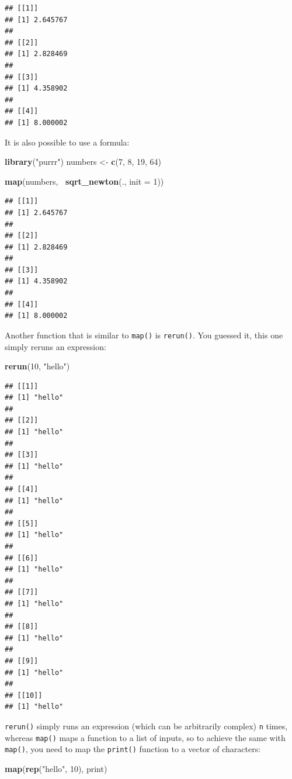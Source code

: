\documentclass[]{gitbook}
\newenvironment{Shaded}{\begin{snugshade}}{\end{snugshade}}
\newcommand{\DataTypeTok}[1]{\textcolor[rgb]{0.13,0.29,0.53}{#1}}
\newcommand{\DecValTok}[1]{\textcolor[rgb]{0.00,0.00,0.81}{#1}}
\newcommand{\KeywordTok}[1]{\textcolor[rgb]{0.13,0.29,0.53}{\textbf{#1}}}
\newcommand{\NormalTok}[1]{#1}
\newcommand{\OperatorTok}[1]{\textcolor[rgb]{0.81,0.36,0.00}{\textbf{#1}}}
\newcommand{\StringTok}[1]{\textcolor[rgb]{0.31,0.60,0.02}{#1}}
\begin{document}
\begin{verbatim}
## [[1]]
## [1] 2.645767
## 
## [[2]]
## [1] 2.828469
## 
## [[3]]
## [1] 4.358902
## 
## [[4]]
## [1] 8.000002
\end{verbatim}

It is also possible to use a formula:

\begin{Shaded}
\begin{Highlighting}[]
\KeywordTok{library}\NormalTok{(}\StringTok{"purrr"}\NormalTok{)}
\NormalTok{numbers <-}\StringTok{ }\KeywordTok{c}\NormalTok{(}\DecValTok{7}\NormalTok{, }\DecValTok{8}\NormalTok{, }\DecValTok{19}\NormalTok{, }\DecValTok{64}\NormalTok{)}

\KeywordTok{map}\NormalTok{(numbers, }\OperatorTok{~}\KeywordTok{sqrt_newton}\NormalTok{(., }\DataTypeTok{init =} \DecValTok{1}\NormalTok{))}
\end{Highlighting}
\end{Shaded}

\begin{verbatim}
## [[1]]
## [1] 2.645767
## 
## [[2]]
## [1] 2.828469
## 
## [[3]]
## [1] 4.358902
## 
## [[4]]
## [1] 8.000002
\end{verbatim}

Another function that is similar to \texttt{map()} is \texttt{rerun()}. You guessed it, this one simply
reruns an expression:

\begin{Shaded}
\begin{Highlighting}[]
\KeywordTok{rerun}\NormalTok{(}\DecValTok{10}\NormalTok{, }\StringTok{"hello"}\NormalTok{)}
\end{Highlighting}
\end{Shaded}

\begin{verbatim}
## [[1]]
## [1] "hello"
## 
## [[2]]
## [1] "hello"
## 
## [[3]]
## [1] "hello"
## 
## [[4]]
## [1] "hello"
## 
## [[5]]
## [1] "hello"
## 
## [[6]]
## [1] "hello"
## 
## [[7]]
## [1] "hello"
## 
## [[8]]
## [1] "hello"
## 
## [[9]]
## [1] "hello"
## 
## [[10]]
## [1] "hello"
\end{verbatim}

\texttt{rerun()} simply runs an expression (which can be arbitrarily complex) \texttt{n} times, whereas \texttt{map()}
maps a function to a list of inputs, so to achieve the same with \texttt{map()}, you need to map the \texttt{print()}
function to a vector of characters:

\begin{Shaded}
\begin{Highlighting}[]
\KeywordTok{map}\NormalTok{(}\KeywordTok{rep}\NormalTok{(}\StringTok{"hello"}\NormalTok{, }\DecValTok{10}\NormalTok{), print)}
\end{Highlighting}
\end{Shaded}
\end{document}
